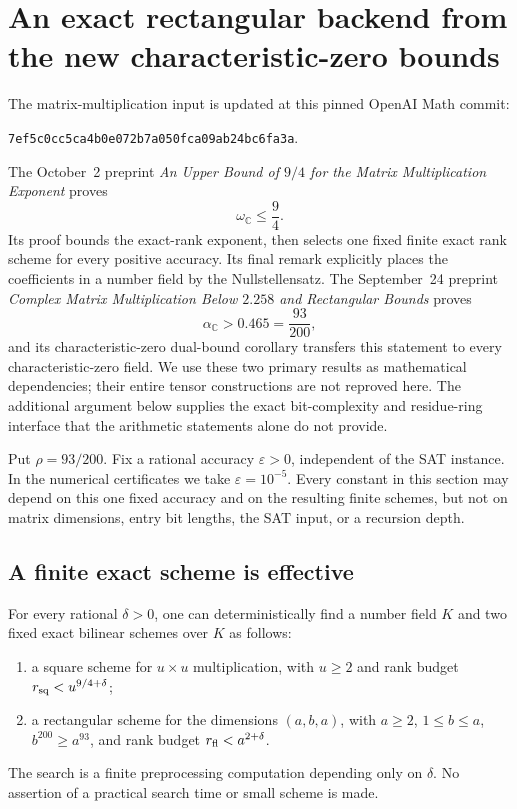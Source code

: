 \section{An exact rectangular backend from the new characteristic-zero bounds}
\label{sec:number-field-backend}

The matrix-multiplication input is updated at this pinned OpenAI Math commit:
\begin{center}\small
\texttt{7ef5c0cc5ca4b0e072b7a050fca09ab24bc6fa3a}.
\end{center}
The October~2 preprint \cite{matrix94} \emph{An Upper Bound of $9/4$ for the Matrix
Multiplication Exponent} proves
\[
 \omega_{\mathbb C}\leq\frac94.
\]
Its proof bounds the exact-rank exponent, then selects one fixed finite
exact rank scheme for every positive accuracy. Its final remark explicitly
places the coefficients in a number field by the Nullstellensatz.
The September~24 preprint \cite{matrixdual} \emph{Complex Matrix Multiplication Below
$2.258$ and Rectangular Bounds} proves
\[
 \alpha_{\mathbb C}>0.465=\frac{93}{200},
\]
and its characteristic-zero dual-bound corollary transfers this statement
to every characteristic-zero field. We use these two primary results as
mathematical dependencies; their entire tensor constructions are not
reproved here. The additional argument below supplies the exact
bit-complexity and residue-ring interface that the arithmetic statements
alone do not provide.

Put $\rho=93/200$. Fix a rational accuracy $\varepsilon>0$, independent
of the SAT instance. In the numerical certificates we take
$\varepsilon=10^{-5}$. Every constant in this section may depend on this
one fixed accuracy and on the resulting finite schemes, but not on matrix
dimensions, entry bit lengths, the SAT input, or a recursion depth.

\subsection{A finite exact scheme is effective}

\begin{lemma}
\label{lem:effective-algebraic-schemes}
For every rational $\delta>0$, one can deterministically find a number
field $K$ and two fixed exact bilinear schemes over $K$ as follows:
\begin{enumerate}
\item a square scheme for $u\times u$ multiplication, with $u\geq2$
and rank budget $r_{\rm sq}<u^{9/4+\delta}$;
\item a rectangular scheme for the dimensions $(a,b,a)$, with
$a\geq2$, $1\leq b\leq a$, $b^{200}\geq a^{93}$, and rank budget
$r_{\rm fl}<a^{2+\delta}$.
\end{enumerate}
The search is a finite preprocessing computation depending only on
$\delta$. No assertion of a practical search time or small scheme is made.
\end{lemma}


